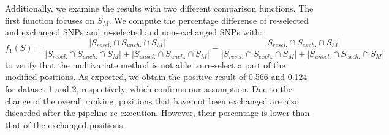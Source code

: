 \documentclass{article}
\begin{document}
Additionally, we examine the results with two different comparison functions. The first function focuses on %
$S_{M}$. We compute the percentage difference of re-selected and exchanged SNPs and re-selected and non-exchanged SNPs with:
\begin{equation*}
f_{1}(S)=
\frac{|S_{resel.}\cap S_{unch.}\cap S_{M}|}{|S_{resel.}\cap S_{unch.}\cap S_{M}|+|S_{unsel.}\cap S_{unch.}\cap S_{M}|}- 
\frac{|S_{resel.}\cap S_{exch.}\cap S_{M}|}{|S_{resel.}\cap S_{exch.}\cap S_{M}|+|S_{unsel.}\cap S_{exch.}\cap S_{M}|}
\end{equation*}
to verify that the multivariate method is not able to re-select a part of the modified positions. As expected, we obtain the positive result of 0.566 and 0.124 for dataset 1 and 2, respectively, which confirms our assumption. 
Due to the change of the overall ranking, positions that have not been exchanged are also discarded after the pipeline re-execution. However, their percentage is lower than that of the exchanged positions.
\end{document}
